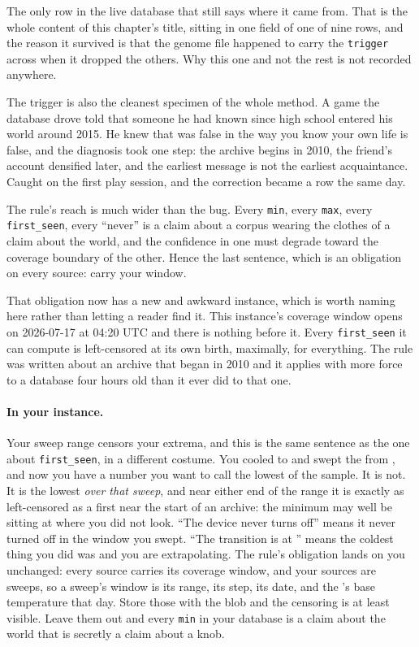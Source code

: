 The only row in the live database that still says where it came from. That is the whole content of this chapter's title, sitting in one field of one of nine rows, and the reason it survived is that the genome file happened to carry the \texttt{trigger} across when it dropped the others. Why this one and not the rest is not recorded anywhere.

The trigger is also the cleanest specimen of the whole method. A game the database drove told \labPI{} that someone he had known since high school entered his world around 2015. He knew that was false in the way you know your own life is false, and the diagnosis took one step: the archive begins in 2010, the friend's account densified later, and the earliest message is not the earliest acquaintance. Caught on the first play session, and the correction became a row the same day.

The rule's reach is much wider than the bug. Every \texttt{min}, every \texttt{max}, every \texttt{first\_seen}, every ``never'' is a claim about a corpus wearing the clothes of a claim about the world, and the confidence in one must degrade toward the coverage boundary of the other. Hence the last sentence, which is an obligation on every source: carry your window.

That obligation now has a new and awkward instance, which is worth naming here rather than letting a reader find it. This instance's coverage window opens on 2026-07-17 at 04:20 UTC and there is nothing before it. Every \texttt{first\_seen} it can compute is left-censored at its own birth, maximally, for everything. The rule was written about an archive that began in 2010 and it applies with more force to a database four hours old than it ever did to that one.

\paragraph{In your instance.} Your sweep range censors your extrema, and this is the same sentence as the one about \texttt{first\_seen}, in a different costume. You cooled to \labColdTemp{} and swept the \labGate{} from \labGateRange, and now you have a number you want to call the lowest \labMeasurement{} of the sample. It is not. It is the lowest \labMeasurement{} \emph{over that sweep}, and near either end of the range it is exactly as left-censored as a first \labPriorUnit{} near the start of an archive: the minimum may well be sitting at \labGateBeyond{} where you did not look. ``The device never turns off'' means it never turned off in the window you swept. ``The transition is at \labColdOnset'' means the coldest thing you did was \labColdTemp{} and you are extrapolating. The rule's obligation lands on you unchanged: every source carries its coverage window, and your sources are sweeps, so a sweep's window is its range, its step, its date, and the \labColdSystemShort's base temperature that day. Store those with the blob and the censoring is at least visible. Leave them out and every \texttt{min} in your database is a claim about the world that is secretly a claim about a knob.

